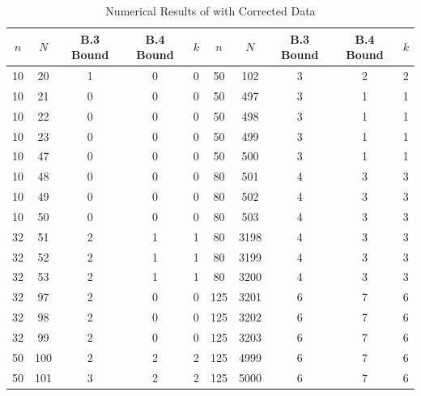 \documentclass[12pt]{article}
\begin{document}
\begin{table}[htbp]
    \centering
    \begin{tabular}{ccccc|ccccc}
        \toprule
        $n$ & $N$ & B.3 Bound & B.4 Bound & $k$ & $n$ & $N$ & B.3 Bound & B.4 Bound & $k$ \\
        \midrule
        10 & 20 & 1 & 0 & 0 & 50 & 102 & 3 & 2 & 2 \\
        10 & 21 & 0 & 0 & 0 & 50 & 497 & 3 & 1 & 1 \\
        10 & 22 & 0 & 0 & 0 & 50 & 498 & 3 & 1 & 1 \\
        10 & 23 & 0 & 0 & 0 & 50 & 499 & 3 & 1 & 1 \\
        10 & 47 & 0 & 0 & 0 & 50 & 500 & 3 & 1 & 1 \\
        10 & 48 & 0 & 0 & 0 & 80 & 501 & 4 & 3 & 3 \\
        10 & 49 & 0 & 0 & 0 & 80 & 502 & 4 & 3 & 3 \\
        10 & 50 & 0 & 0 & 0 & 80 & 503 & 4 & 3 & 3 \\
        32 & 51 & 2 & 1 & 1 & 80 & 3198 & 4 & 3 & 3 \\
        32 & 52 & 2 & 1 & 1 & 80 & 3199 & 4 & 3 & 3 \\
        32 & 53 & 2 & 1 & 1 & 80 & 3200 & 4 & 3 & 3 \\
        32 & 97 & 2 & 0 & 0 & 125 & 3201 & 6 & 7 & 6 \\
        32 & 98 & 2 & 0 & 0 & 125 & 3202 & 6 & 7 & 6 \\
        32 & 99 & 2 & 0 & 0 & 125 & 3203 & 6 & 7 & 6 \\
        50 & 100 & 2 & 2 & 2 & 125 & 4999 & 6 & 7 & 6 \\
        50 & 101 & 3 & 2 & 2 & 125 & 5000 & 6 & 7 & 6 \\
        \bottomrule
    \end{tabular}
    \caption{Numerical Results of \cite{JJF2005} with Corrected Data}
\end{table}

\clearpage
\end{document}
